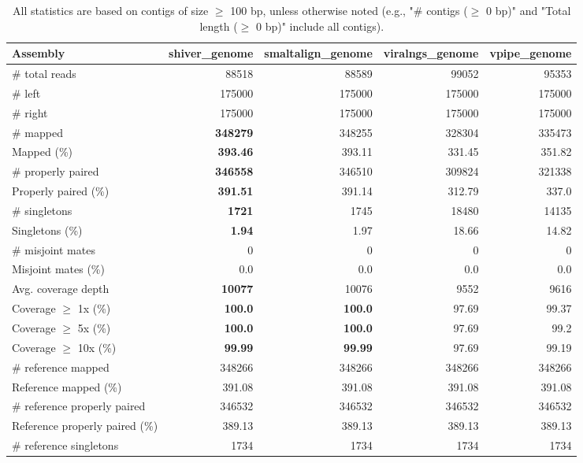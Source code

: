 \documentclass[12pt,a4paper]{article}
\begin{document}
\begin{table}[ht]
\begin{center}
\caption{All statistics are based on contigs of size $\geq$ 100 bp, unless otherwise noted (e.g., "\# contigs ($\geq$ 0 bp)" and "Total length ($\geq$ 0 bp)" include all contigs).}
\begin{tabular}{|l*{4}{|r}|}
\hline
Assembly & shiver\_genome & smaltalign\_genome & viralngs\_genome & vpipe\_genome \\ \hline
\# total reads & 88518 & 88589 & 99052 & 95353 \\ \hline
\# left & 175000 & 175000 & 175000 & 175000 \\ \hline
\# right & 175000 & 175000 & 175000 & 175000 \\ \hline
\# mapped & {\bf 348279} & 348255 & 328304 & 335473 \\ \hline
Mapped (\%) & {\bf 393.46} & 393.11 & 331.45 & 351.82 \\ \hline
\# properly paired & {\bf 346558} & 346510 & 309824 & 321338 \\ \hline
Properly paired (\%) & {\bf 391.51} & 391.14 & 312.79 & 337.0 \\ \hline
\# singletons & {\bf 1721} & 1745 & 18480 & 14135 \\ \hline
Singletons (\%) & {\bf 1.94} & 1.97 & 18.66 & 14.82 \\ \hline
\# misjoint mates & 0 & 0 & 0 & 0 \\ \hline
Misjoint mates (\%) & 0.0 & 0.0 & 0.0 & 0.0 \\ \hline
Avg. coverage depth & {\bf 10077} & 10076 & 9552 & 9616 \\ \hline
Coverage $\geq$ 1x (\%) & {\bf 100.0} & {\bf 100.0} & 97.69 & 99.37 \\ \hline
Coverage $\geq$ 5x (\%) & {\bf 100.0} & {\bf 100.0} & 97.69 & 99.2 \\ \hline
Coverage $\geq$ 10x (\%) & {\bf 99.99} & {\bf 99.99} & 97.69 & 99.19 \\ \hline
\# reference mapped & 348266 & 348266 & 348266 & 348266 \\ \hline
Reference mapped (\%) & 391.08 & 391.08 & 391.08 & 391.08 \\ \hline
\# reference properly paired & 346532 & 346532 & 346532 & 346532 \\ \hline
Reference properly paired (\%) & 389.13 & 389.13 & 389.13 & 389.13 \\ \hline
\# reference singletons & 1734 & 1734 & 1734 & 1734 \\ \hline

\end{tabular}
\end{center}
\end{table}
\end{document}
